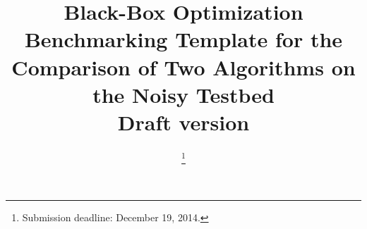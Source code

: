 \documentclass[conference]{IEEEtran}
\begin{document}
%
\title{Black-Box Optimization Benchmarking Template for the Comparison of Two Algorithms on the Noisy Testbed\\ {\large Draft version}}

\author{
\thanks{Submission deadline: December 19, 2014.}
}

\IEEEoverridecommandlockouts

% 
\end{document}
